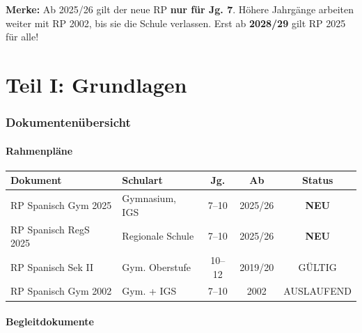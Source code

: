 \documentclass[11pt,a4paper]{article}
\begin{document}
\begin{wichtigbox}
\textbf{Merke:} Ab 2025/26 gilt der neue RP \textbf{nur für Jg. 7}. Höhere Jahrgänge arbeiten weiter mit RP 2002, bis sie die Schule verlassen. Erst ab \textbf{2028/29} gilt RP 2025 für alle!
\end{wichtigbox}

\newpage
\part*{Teil I: Grundlagen}

\section{Dokumentenübersicht}

\subsection{Rahmenpläne}

\begin{tabularx}{\textwidth}{H X c c c}
\textbf{Dokument} & \textbf{Schulart} & \textbf{Jg.} & \textbf{Ab} & \textbf{Status} \\
\hline
RP Spanisch Gym 2025 & Gymnasium, IGS & 7--10 & 2025/26 & \textbf{NEU} \\
RP Spanisch RegS 2025 & Regionale Schule & 7--10 & 2025/26 & \textbf{NEU} \\
RP Spanisch Sek II & Gym. Oberstufe & 10--12 & 2019/20 & GÜLTIG \\
RP Spanisch Gym 2002 & Gym. + IGS & 7--10 & 2002 & AUSLAUFEND \\
\hline
\end{tabularx}

\subsection{Begleitdokumente}
\end{document}
